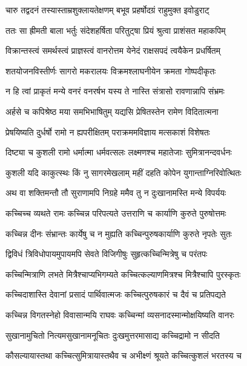 \twolineshloka
{चारु तद्वदनं तस्यास्ताम्रशुक्लायतेक्षणम्}
{बभूव प्रहर्षोदग्रं राहुमुक्त इवोडुराट्} %

\twolineshloka
{ततः सा ह्रीमती बाला भर्तुः संदेशहर्षिता}
{परितुट्षा प्रियं श्रुत्वा प्राशंसत महाकपिम्} %

\twolineshloka
{विक्रान्तस्त्वं समर्थस्त्वं प्राज्ञस्त्वं वानरोत्तम}
{येनेदं राक्षसपदं त्वयैकेन प्रधर्षितम्} %

\twolineshloka
{शतयोजनविस्तीर्णः सागरो मकरालयः}
{विक्रमश्लाघनीयेन क्रमता गोष्पदीकृतः} %

\twolineshloka
{न हि त्वां प्राकृतं मन्ये वनरं वनरर्षभ}
{यस्य ते नास्ति संत्रासो रावणान्नापि संभ्रमः} %

\twolineshloka
{अर्हसे च कपिश्रेष्ठ मया समभिभाषितुम्}
{यद्यसि प्रेषितस्तेन रामेण विदितात्मना} %

\twolineshloka
{प्रेषयिष्यति दुर्धर्षो रामो न ह्यपरीक्षितम्}
{पराक्रममविज्ञाय मत्सकाशं विशेषतः} %

\twolineshloka
{दिष्ट्या च कुशली रामो धर्मात्मा धर्मवत्सलः}
{लक्ष्मणश्च महातेजाः सुमित्रानन्दवर्धनः} %

\twolineshloka
{कुशली यदि काकुत्स्थः किं नु सागरमेखलाम्}
{महीं दहति कोपेन युगान्ताग्निरिवोत्थितः} %

\twolineshloka
{अथ वा शक्तिमन्तौ तौ सुराणामपि निग्रहे}
{ममैव तु न दुःखानामस्ति मन्ये विपर्ययः} %

\twolineshloka
{कच्चिच्च व्यथते रामः कच्चिन्न परिपत्यते}
{उत्तराणि च कार्याणि कुरुते पुरुषोत्तमः} %

\twolineshloka
{कच्चिन्न दीनः संभ्रान्तः कार्येषु च न मुह्यति}
{कच्चिन्पुरुषकार्याणि कुरुते नृपतेः सुतः} %

\twolineshloka
{द्विविधं त्रिविधोपायमुपायमपि सेवते}
{विजिगीषुः सुहृत्कच्चिन्मित्रेषु च परंतपः} %

\twolineshloka
{कच्चिन्मित्राणि लभते मित्रैश्चाप्यभिगम्यते}
{कच्चित्कल्याणमित्रश्च मित्रैश्चापि पुरस्कृतः} %

\twolineshloka
{कच्चिदाशास्ति देवानां प्रसादं पार्थिवात्मजः}
{कच्चित्पुरुषकारं च दैवं च प्रतिपद्यते} %

\twolineshloka
{कच्चिन्न विगतस्नेहो विवासान्मयि राघवः}
{कच्चिन्मां व्यसनादस्मान्मोक्षयिष्यति वानरः} %

\twolineshloka
{सुखानामुचितो नित्यमसुखानामनूचितः}
{दुःखमुत्तरमासाद्य कच्चिद्रामो न सीदति} %

\twolineshloka
{कौसल्यायास्तथा कच्चित्सुमित्रायास्तथैव च}
{अभीक्ष्णं श्रूयते कच्चित्कुशलं भरतस्य च} %

